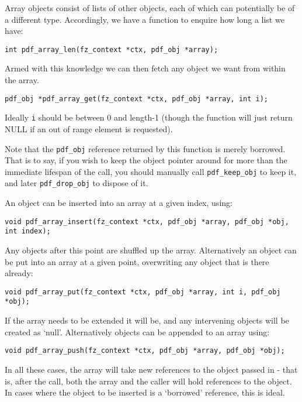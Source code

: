 \documentclass[oneside]{book}
\begin{document}
Array objects consist of lists of other objects, each of which can  potentially be of a different type. Accordingly, we have a function to enquire how long a list we have:

\begin{lstlisting}
int pdf_array_len(fz_context *ctx, pdf_obj *array);
\end{lstlisting}

Armed with this knowledge we can then fetch any object we want from within the array.

\begin{lstlisting}
pdf_obj *pdf_array_get(fz_context *ctx, pdf_obj *array, int i);
\end{lstlisting}

Ideally \texttt{i} should be between 0 and length-1 (though the function will just return NULL if an out of range element is requested).

Note that the \texttt{pdf\_obj} reference returned by this function is merely borrowed. That is to say, if you wish to keep the object pointer around for more than the immediate lifespan of the call, you should manually call \texttt{pdf\_keep\_obj} to keep it, and later \texttt{pdf\_drop\_obj} to dispose of it.

An object can be inserted into an array at a given index, using:

\begin{lstlisting}
void pdf_array_insert(fz_context *ctx, pdf_obj *array, pdf_obj *obj, int index);
\end{lstlisting}

Any objects after this point are shuffled up the array. Alternatively an object can be put into an array at a given point, overwriting any object that is there already:

\begin{lstlisting}
void pdf_array_put(fz_context *ctx, pdf_obj *array, int i, pdf_obj *obj);
\end{lstlisting}

If the array needs to be extended it will be, and any intervening objects will be created as `null'. Alternatively objects can be appended to an array using:

\begin{lstlisting}
void pdf_array_push(fz_context *ctx, pdf_obj *array, pdf_obj *obj);
\end{lstlisting}

In all these cases, the array will take new references to the object passed in - that is, after the call, both the array and the caller will hold references to the object. In cases where the object to be inserted is a `borrowed' reference, this is ideal.
\end{document}
